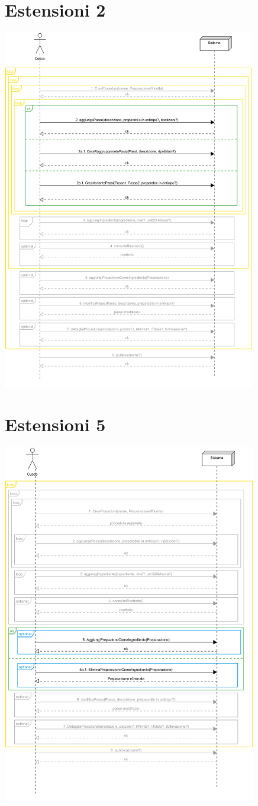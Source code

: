 \section*{Estensioni 2}
\includegraphics[max width=\textwidth, max height=158mm]{../resources/img/GRP/SSD/ext2.png}

\section*{Estensioni 5}
\includegraphics[max width=\textwidth, max height=158mm]{../resources/img/GRP/SSD/ext5.png}
\RaggedRight